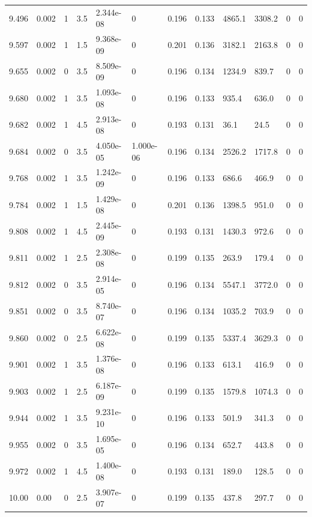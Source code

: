 \documentclass[preview]{standalone}
\begin{document}
{{{{{{{{{{\begin{tabular}{L{1.2cm}C{1.2cm} C{0.3cm}C{0.5cm} C{1.4cm}C{1.4cm} C{1.4cm}C{1.4cm} C{1.6cm}C{1.6cm} C{1.6cm}C{1.6cm}}
  9.496  &  0.002  & 1     & 3.5 &  2.344e-08  & 0  &  0.196&   0.133& 4865.1 & 3308.2   &  0 & 0  \\ 
  9.597  &  0.002  & 1     & 1.5 &  9.368e-09  & 0  &  0.201&   0.136& 3182.1 & 2163.8   &  0 & 0  \\ 
  9.655  &  0.002  & 0     & 3.5 &  8.509e-09  & 0  &  0.196&   0.134& 1234.9 & 839.7   &  0 & 0  \\ 
  9.680  &  0.002  & 1     & 3.5 &  1.093e-08  & 0  &  0.196&   0.133& 935.4 & 636.0   &  0 & 0  \\ 
  9.682  &  0.002  & 1     & 4.5 &  2.913e-08  & 0  &  0.193&   0.131& 36.1 & 24.5   &  0 & 0  \\ 
  9.684  &  0.002  & 0     & 3.5 &  4.050e-05  & 1.000e-06  &  0.196&   0.134& 2526.2 & 1717.8   &  0 & 0  \\ 
  9.768  &  0.002  & 1     & 3.5 &  1.242e-09  & 0  &  0.196&   0.133& 686.6 & 466.9   &  0 & 0  \\ 
  9.784  &  0.002  & 1     & 1.5 &  1.429e-08  & 0  &  0.201&   0.136& 1398.5 & 951.0   &  0 & 0  \\ 
  9.808  &  0.002  & 1     & 4.5 &  2.445e-09  & 0  &  0.193&   0.131& 1430.3 & 972.6   &  0 & 0  \\ 
  9.811  &  0.002  & 1     & 2.5 &  2.308e-08  & 0  &  0.199&   0.135& 263.9 & 179.4   &  0 & 0  \\ 
  9.812  &  0.002  & 0     & 3.5 &  2.914e-05  & 0  &  0.196&   0.134& 5547.1 & 3772.0   &  0 & 0  \\ 
  9.851  &  0.002  & 0     & 3.5 &  8.740e-07  & 0  &  0.196&   0.134& 1035.2 & 703.9   &  0 & 0  \\ 
  9.860  &  0.002  & 0     & 2.5 &  6.622e-08  & 0  &  0.199&   0.135& 5337.4 & 3629.3   &  0 & 0  \\ 
  9.901  &  0.002  & 1     & 3.5 &  1.376e-08  & 0  &  0.196&   0.133& 613.1 & 416.9   &  0 & 0  \\ 
  9.903  &  0.002  & 1     & 2.5 &  6.187e-09  & 0  &  0.199&   0.135& 1579.8 & 1074.3   &  0 & 0  \\ 
  9.944  &  0.002  & 1     & 3.5 &  9.231e-10  & 0  &  0.196&   0.133& 501.9 & 341.3   &  0 & 0  \\ 
  9.955  &  0.002  & 0     & 3.5 &  1.695e-05  & 0  &  0.196&   0.134& 652.7 & 443.8   &  0 & 0  \\ 
  9.972  &  0.002  & 1     & 4.5 &  1.400e-08  & 0  &  0.193&   0.131& 189.0 & 128.5   &  0 & 0  \\ 
  10.00  &  0.00  & 0     & 2.5 &  3.907e-07  & 0  &  0.199&   0.135& 437.8 & 297.7   &  0 & 0  \\ 

\end{tabular}}}}}}}}}}}
\end{document}
